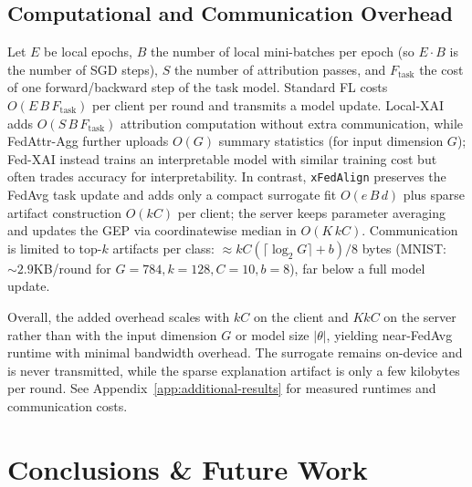 \documentclass{article}
\theoremstyle{plain}
\theoremstyle{definition}
\theoremstyle{remark}
\begin{document}
\subsection{Computational and Communication Overhead}

Let \(E\) be local epochs, \(B\) the number of local mini-batches per epoch (so \(E\!\cdot\!B\) is the number of SGD steps), \(S\) the number of attribution passes, and \(F_{\text{task}}\) the cost of one forward/backward step of the task model. Standard FL costs \(O(E\,B\,F_{\text{task}})\) per client per round and transmits a model update. Local-XAI adds \(O(S\,B\,F_{\text{task}})\) attribution computation without extra communication, while FedAttr-Agg further uploads \(O(G)\) summary statistics (for input dimension \(G\)); Fed-XAI instead trains an interpretable model with similar training cost but often trades accuracy for interpretability. In contrast, \texttt{xFedAlign} preserves the FedAvg task update and adds only a compact surrogate fit \(O(e\,B\,d)\) plus sparse artifact construction \(O(kC)\) per client; the server keeps parameter averaging and updates the GEP via coordinatewise median in \(O(K\,kC)\). Communication is limited to top-\(k\) artifacts per class: \(\approx kC(\lceil\log_2 G\rceil+b)/8\) bytes (MNIST: \(\sim 2.9\)KB/round for \(G{=}784,k{=}128,C{=}10,b{=}8\)), far below a full model update. 

Overall, the added overhead scales with \(kC\) on the client and \(KkC\) on the server rather than with the input dimension \(G\) or model size \(|\theta|\), yielding near-FedAvg runtime with minimal bandwidth overhead. The surrogate remains on-device and is never transmitted, while the sparse explanation artifact is only a few kilobytes per round. See Appendix~\ref{app:additional-results} for measured runtimes and communication costs.


\section{Conclusions \& Future Work}
\end{document}
